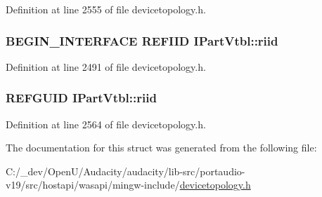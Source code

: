 Definition at line 2555 of file devicetopology.\+h.

\subsubsection[{\texorpdfstring{riid}{riid}}]{\setlength{\rightskip}{0pt plus 5cm}B\+E\+G\+I\+N\+\_\+\+I\+N\+T\+E\+R\+F\+A\+CE {\bf R\+E\+F\+I\+ID} I\+Part\+Vtbl\+::riid}\hypertarget{struct_i_part_vtbl_a089005c5fe84deaa590c2401d4bf1a5a}{}\label{struct_i_part_vtbl_a089005c5fe84deaa590c2401d4bf1a5a}


Definition at line 2491 of file devicetopology.\+h.

\subsubsection[{\texorpdfstring{riid}{riid}}]{ R\+E\+F\+G\+U\+ID I\+Part\+Vtbl\+::riid}\hypertarget{struct_i_part_vtbl_ab8b7d1d130d5cf53036fe5ab1971dbc1}{}\label{struct_i_part_vtbl_ab8b7d1d130d5cf53036fe5ab1971dbc1}


Definition at line 2564 of file devicetopology.\+h.



The documentation for this struct was generated from the following file\+:\begin{DoxyCompactItemize}
\item 
C\+:/\+\_\+dev/\+Open\+U/\+Audacity/audacity/lib-\/src/portaudio-\/v19/src/hostapi/wasapi/mingw-\/include/\hyperlink{devicetopology_8h}{devicetopology.\+h}\end{DoxyCompactItemize}
